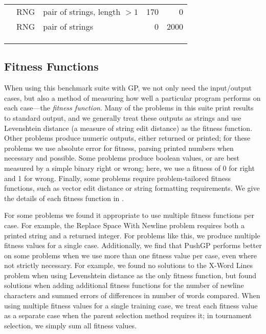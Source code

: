 \documentclass{sig-alternate}
\begin{document}
\begin{table*}
\begin{tabular}{>{\raggedright}p{3.5cm} l >{\raggedright}p{9.8cm} rr}
 & RNG & pair of strings, length $> 1$ & 170 & 0 \tabularnewline
 & RNG & pair of strings & 0 & 2000 \tabularnewline
 &  &  &  &  \tabularnewline
 &  &  &  &  \tabularnewline
 &  &  &  &  \tabularnewline
\bottomrule
\end{tabular}
\end{table*}







\subsection{Fitness Functions}

When using this benchmark suite with GP, we not only need the input/output cases, but also a method of measuring how well a particular program performs on each case---the \textit{fitness function}. 
Many of the problems in this suite print results to standard output, and we generally treat these outputs as strings and use Levenshtein distance (a measure of string edit distance) as the fitness function. Other problems produce numeric outputs, either returned or printed; for these problems we use absolute error for fitness, parsing printed numbers when necessary and possible. Some problems produce boolean values, or are best measured by a simple binary right or wrong; here, we use a fitness of 0 for right and 1 for wrong. Finally, some problems require problem-tailored fitness functions, such as vector edit distance or string formatting requirements. We give the details of each fitness function in \cite{helmuth:umass:tr}.

For some problems we found it appropriate to use multiple fitness functions per case. For example, the Replace Space With Newline problem requires both a printed string and a returned integer. For problems like this, we produce multiple fitness values for a single case. Additionally, we find that PushGP performs better on some problems when we use more than one fitness value per case, even where not strictly necessary. For example, we found no solutions to the X-Word Lines problem when using Levenshtein distance as the only fitness function, but found solutions when adding additional fitness functions for the number of newline characters and summed errors of differences in number of words compared. When using multiple fitness values for a single training case, we treat each fitness value as a separate case when the parent selection method requires it; in tournament selection, we simply sum all fitness values.
\end{document}
